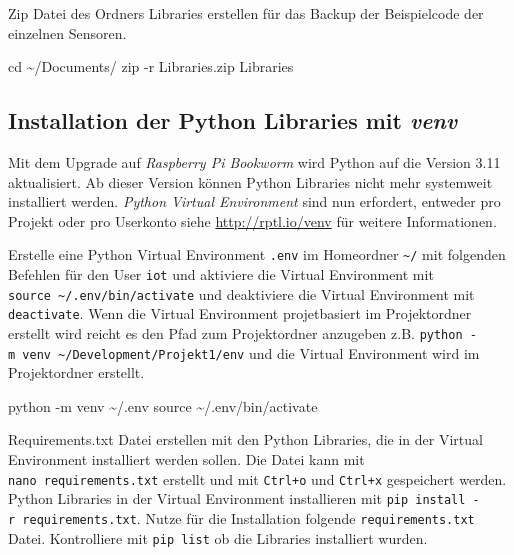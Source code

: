 \documentclass[
  11pt,
  a4paperpaper,
  oneside, openany  ,captions=tableheading
]{scrbook}
\newenvironment{Shaded}{\begin{snugshade}}{\end{snugshade}}
\newcommand{\AttributeTok}[1]{\textcolor[rgb]{0.40,0.45,0.13}{#1}}
\newcommand{\BuiltInTok}[1]{\textcolor[rgb]{0.00,0.23,0.31}{#1}}
\newcommand{\ExtensionTok}[1]{\textcolor[rgb]{0.00,0.23,0.31}{#1}}
\newcommand{\FunctionTok}[1]{\textcolor[rgb]{0.28,0.35,0.67}{#1}}
\newcommand{\NormalTok}[1]{\textcolor[rgb]{0.00,0.23,0.31}{#1}}
\theoremstyle{definition}
\theoremstyle{remark}
\begin{document}
Zip Datei des Ordners Libraries erstellen für das Backup der
Beispielcode der einzelnen Sensoren.

\begin{Shaded}
\begin{Highlighting}[]
\BuiltInTok{cd}\NormalTok{ \textasciitilde{}/Documents/}
\FunctionTok{zip} \AttributeTok{{-}r}\NormalTok{ Libraries.zip Libraries}
\end{Highlighting}
\end{Shaded}

\subsection{\texorpdfstring{Installation der Python Libraries mit
\emph{venv}}{Installation der Python Libraries mit venv}}\label{installation-der-python-libraries-mit-venv}

Mit dem Upgrade auf \emph{Raspberry Pi Bookworm} wird Python auf die
Version 3.11 aktualisiert. Ab dieser Version können Python Libraries
nicht mehr systemweit installiert werden. \emph{Python Virtual
Environment} sind nun erfordert, entweder pro Projekt oder pro Userkonto
siehe \url{http://rptl.io/venv} für weitere Informationen.

Erstelle eine Python Virtual Environment \texttt{.env} im Homeordner
\texttt{\textasciitilde{}/} mit folgenden Befehlen für den User
\texttt{iot} und aktiviere die Virtual Environment mit
\texttt{source\ \textasciitilde{}/.env/bin/activate} und deaktiviere die
Virtual Environment mit \texttt{deactivate}. Wenn die Virtual
Environment projetbasiert im Projektordner erstellt wird reicht es den
Pfad zum Projektordner anzugeben z.B.
\texttt{python\ -m\ venv\ \textasciitilde{}/Development/Projekt1/env}
und die Virtual Environment wird im Projektordner erstellt.

\begin{Shaded}
\begin{Highlighting}[]
\ExtensionTok{python} \AttributeTok{{-}m}\NormalTok{ venv \textasciitilde{}/.env}
\BuiltInTok{source}\NormalTok{ \textasciitilde{}/.env/bin/activate}
\end{Highlighting}
\end{Shaded}

Requirements.txt Datei erstellen mit den Python Libraries, die in der
Virtual Environment installiert werden sollen. Die Datei kann mit
\texttt{nano\ requirements.txt} erstellt und mit \texttt{Ctrl+o} und
\texttt{Ctrl+x} gespeichert werden. Python Libraries in der Virtual
Environment installieren mit
\texttt{pip\ install\ -r\ requirements.txt}. Nutze für die Installation
folgende \texttt{requirements.txt} Datei. Kontrolliere mit
\texttt{pip\ list} ob die Libraries installiert wurden.
\end{document}
